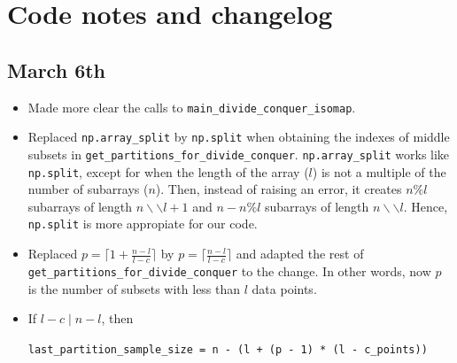 \documentclass[a4paper,12pt]{article}
\begin{document}
\pagebreak
\section{Code notes and changelog}

\subsection{March 6th}

\begin{itemize}
    \item Made more clear the calls to \verb|main_divide_conquer_isomap|.
    \item Replaced \texttt{np.array\_split} by \texttt{np.split} when obtaining the indexes of middle subsets in \nolinkurl{get\_partitions\_for\_divide\_conquer}. \texttt{np.array\_split} works like \texttt{np.split}, except for when the length of the array ($l$) is not a multiple of the number of subarrays ($n$). Then, instead of raising an error, it creates $n\% l$ subarrays of length $n\backslash\backslash l+1$ and $n-n\% l$ subarrays of length $n\backslash\backslash l$. Hence, \texttt{np.split} is more appropiate for our code.
    \item Replaced $p=\lceil 1 + \frac{n-l}{l-c} \rceil$ by $p=\lceil \frac{n-l}{l-c} \rceil$ and adapted the rest of \nolinkurl{get\_partitions\_for\_divide\_conquer} to the change. In other words, now $p$ is the number of subsets with less than $l$ data points.
    \item If $l-c \mid n-l$, then
    
    \verb|last_partition_sample_size = n - (l + (p - 1) * (l - c_points))|


\end{itemize}
\end{document}
